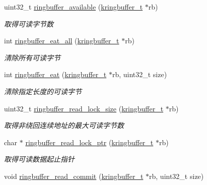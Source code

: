 \begin{DoxyCompactItemize}
uint32\+\_\+t \hyperlink{a00088_aecd5c166ce42982ee434172cc555787d_aecd5c166ce42982ee434172cc555787d}{ringbuffer\+\_\+available} (\hyperlink{a00053_a66d91f7667db1f0b2983fc25e1a20f1c_a66d91f7667db1f0b2983fc25e1a20f1c}{kringbuffer\+\_\+t} $\ast$rb)
\begin{DoxyCompactList}\small\item\em 取得可读字节数 \end{DoxyCompactList}\item 
int \hyperlink{a00088_ab74775801f1ad149ac0beb37336f92e3_ab74775801f1ad149ac0beb37336f92e3}{ringbuffer\+\_\+eat\+\_\+all} (\hyperlink{a00053_a66d91f7667db1f0b2983fc25e1a20f1c_a66d91f7667db1f0b2983fc25e1a20f1c}{kringbuffer\+\_\+t} $\ast$rb)
\begin{DoxyCompactList}\small\item\em 清除所有可读字节 \end{DoxyCompactList}\item 
int \hyperlink{a00088_a1ee13a66a33b0d5648d7c95b48bd6536_a1ee13a66a33b0d5648d7c95b48bd6536}{ringbuffer\+\_\+eat} (\hyperlink{a00053_a66d91f7667db1f0b2983fc25e1a20f1c_a66d91f7667db1f0b2983fc25e1a20f1c}{kringbuffer\+\_\+t} $\ast$rb, uint32\+\_\+t size)
\begin{DoxyCompactList}\small\item\em 清除指定长度的可读字节 \end{DoxyCompactList}\item 
uint32\+\_\+t \hyperlink{a00088_a4bd33ec2ce3cba490a6166c5eac88f5c_a4bd33ec2ce3cba490a6166c5eac88f5c}{ringbuffer\+\_\+read\+\_\+lock\+\_\+size} (\hyperlink{a00053_a66d91f7667db1f0b2983fc25e1a20f1c_a66d91f7667db1f0b2983fc25e1a20f1c}{kringbuffer\+\_\+t} $\ast$rb)
\begin{DoxyCompactList}\small\item\em 取得非绕回连续地址的最大可读字节数 \end{DoxyCompactList}\item 
char $\ast$ \hyperlink{a00088_a51fd16b89396cbe6a3e4cf3d41b4dda5_a51fd16b89396cbe6a3e4cf3d41b4dda5}{ringbuffer\+\_\+read\+\_\+lock\+\_\+ptr} (\hyperlink{a00053_a66d91f7667db1f0b2983fc25e1a20f1c_a66d91f7667db1f0b2983fc25e1a20f1c}{kringbuffer\+\_\+t} $\ast$rb)
\begin{DoxyCompactList}\small\item\em 取得可读数据起止指针 \end{DoxyCompactList}\item 
void \hyperlink{a00088_a5d0caeccb61acafaa4c5148b697dd927_a5d0caeccb61acafaa4c5148b697dd927}{ringbuffer\+\_\+read\+\_\+commit} (\hyperlink{a00053_a66d91f7667db1f0b2983fc25e1a20f1c_a66d91f7667db1f0b2983fc25e1a20f1c}{kringbuffer\+\_\+t} $\ast$rb, uint32\+\_\+t size)

\end{DoxyCompactItemize}
